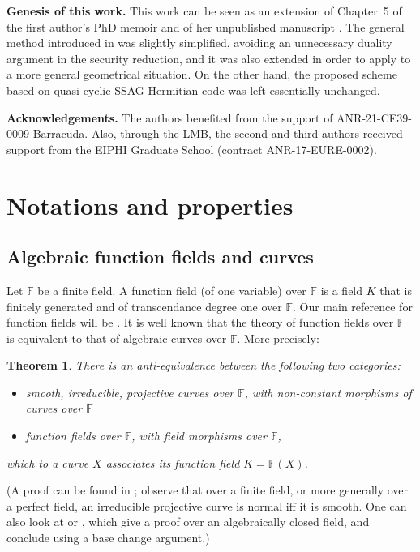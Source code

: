 \documentclass[10pt]{article}
\newtheorem{thm}{Theorem}
\theoremstyle{definition}
\theoremstyle{definition}
\theoremstyle{definition}
\newcommand{\F}{\mathbb{F}}
\begin{document}
\textbf{Genesis of this work.}
This work can be seen as an extension of Chapter~5 of the first author's PhD memoir \cite{Bar} and of her unpublished manuscript \cite{Bar2}.
The general method introduced in \cite{Bar} was slightly simplified, avoiding an unnecessary duality argument in the security reduction, and it was also extended in order to apply to a more general geometrical situation.
On the other hand, the proposed scheme based on quasi-cyclic SSAG Hermitian code was left essentially unchanged.



\textbf{Acknowledgements.}
The authors benefited from the support of ANR-21-CE39-0009 Barracuda.
Also, through the LMB, the second and third authors received support from
the EIPHI Graduate School (contract ANR-17-EURE-0002).


\section{Notations and properties}


\subsection{Algebraic function fields and curves}


Let $\F$ be a finite field. A function field (of one variable) over $\F$ is a field $K$ that is finitely generated and of transcendance degree one over $\F$.
Our main reference for function fields will be \cite{Sti}.
It is well known that the theory of function fields over $\F$ is equivalent to that of algebraic curves over $\F$. More precisely:

\begin{thm}\label{antieq}
There is an anti-equivalence between the following two categories:
\begin{itemize}
\item smooth, irreducible, projective curves over $\F$, with non-constant morphisms of curves over $\F$
\item function fields over $\F$, with field morphisms over $\F$,
\end{itemize}
which to a curve $X$ associates its function field $K=\F(X)$.
\end{thm}

(A proof can be found in \cite[Prop.~7.3.13 and Rem.~7.3.14]{Liu}; observe that over a finite field, or more generally over a perfect field, an irreducible projective curve is normal iff it is smooth.
One can also look at \cite[\S7.5]{Fulton} or \cite[Cor.~I.6.12]{Hartshorne}, which give a proof over an algebraically closed field, and conclude using a base change argument.)
\end{document}
